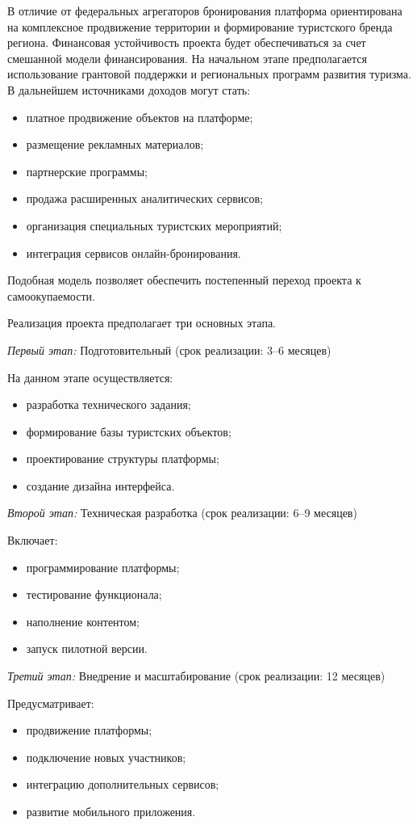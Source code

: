 В отличие от федеральных агрегаторов бронирования платформа ориентирована на комплексное продвижение территории и формирование туристского бренда региона.
Финансовая устойчивость проекта будет обеспечиваться за счет смешанной модели финансирования. На начальном этапе предполагается использование грантовой поддержки и региональных программ развития туризма.
В дальнейшем источниками доходов могут стать:
\begin{itemize}
\item платное продвижение объектов на платформе;
\item размещение рекламных материалов;
\item партнерские программы;
\item продажа расширенных аналитических сервисов;
\item организация специальных туристских мероприятий;
\item интеграция сервисов онлайн-бронирования.
\end{itemize}

Подобная модель позволяет обеспечить постепенный переход проекта к самоокупаемости.

Реализация проекта предполагает три основных этапа.

\emph{Первый этап:} Подготовительный (срок реализации: 3–6 месяцев)

На данном этапе осуществляется:
\begin{itemize}
\item разработка технического задания;
\item формирование базы туристских объектов;
\item проектирование структуры платформы;
\item создание дизайна интерфейса.
\end{itemize}

\emph{Второй этап:} Техническая разработка (срок реализации: 6–9 месяцев)

Включает:
\begin{itemize}
\item программирование платформы;
\item тестирование функционала;
\item наполнение контентом;
\item запуск пилотной версии.
\end{itemize}

\emph{Третий этап:} Внедрение и масштабирование (срок реализации: 12 месяцев)

Предусматривает:
\begin{itemize}
\item продвижение платформы;
\item подключение новых участников;
\item интеграцию дополнительных сервисов;
\item развитие мобильного приложения.
\end{itemize}

